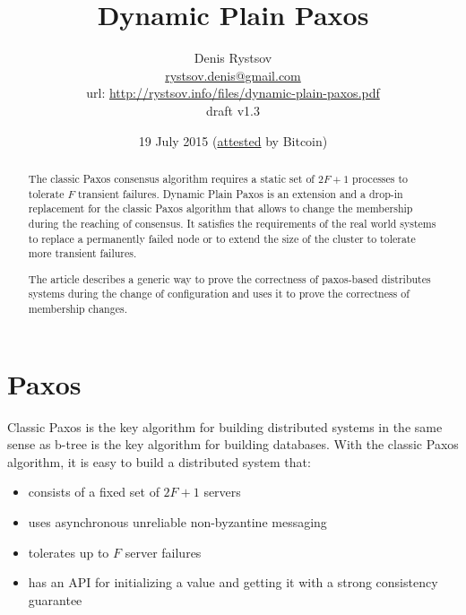 \documentclass[12pt]{article}
\begin{document}
\title{Dynamic Plain Paxos}
\date{19 July 2015 (\hyperlink{attest}{attested} by Bitcoin)}
\author{Denis Rystsov \\
\href{mailto:rystsov.denis@gmail.com}{rystsov.denis@gmail.com}\\
url: \href{http://rystsov.info/files/dynamic-plain-paxos.pdf}{http://rystsov.info/files/dynamic-plain-paxos.pdf}\\
draft v1.3}


\maketitle

\begin{abstract}
The classic Paxos consensus algorithm requires a static set of $2F+1$ processes to tolerate $F$ transient failures. Dynamic Plain Paxos is an extension and a drop-in replacement for the classic Paxos algorithm that allows to change the membership during the reaching of consensus. It satisfies the requirements of the real world systems to replace a permanently failed node or to extend the size of the cluster to tolerate more transient failures.

The article describes a generic way to prove the correctness of paxos-based distributes systems during the change of configuration and uses it to prove the correctness of membership changes.
\end{abstract}


\section{Paxos}

Classic Paxos is the key algorithm for building distributed systems in the same sense as b-tree is the key algorithm for building databases. With the classic Paxos algorithm, it is easy to build a distributed system that:

\begin{itemize}
  \item consists of a fixed set of $2F+1$ servers
  \item uses asynchronous unreliable non-byzantine messaging
  \item tolerates up to $F$ server failures
  \item has an API for initializing a value and getting it with a strong consistency guarantee
\end{itemize}

\newpage
\end{document}
